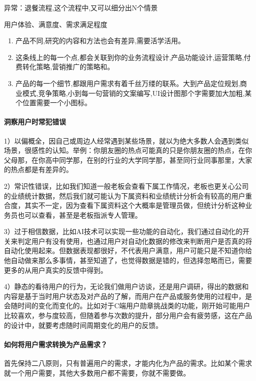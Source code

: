 \documentclass[letterpaper,11pt,english]{sphinxmanual}
\begin{document}
异常：退餐流程,这个流程中,又可以细分出N个情景

用户体验、满意度、需求满足程度
\begin{enumerate}
%
\item {} 
产品不同,研究的内容和方法也会有差异,需要活学活用。

\item {} 
这条线上的每一个点,都会关联到你的业务流程设计,产品功能设计,运营策略,付费转化策略,营销推广的策略和。

\item {} 
产品的每一个细节,都跟用户需求有着千丝万缕的联系。大到产品定位规划,商业模式,竞争策略,小到每一句营销的文案编写,UI设计图那个字需要加大加粗,某个位置需要一个小图标。

\end{enumerate}


\paragraph{洞察用户时常犯错误}
\label{\detokenize{chapter_skill/users_analysis:id19}}
1）以偏概全，因自己或周边人经常遇到某些场景，就以为绝大多数人会遇到类似场景，很感性的认知。举例：你朋友圈的热点可能真的只是你朋友圈的热点，在你父母那，在你高中同学那，在别的行业的大学同学那，甚至同行业同事那里，大家的热点都是有差异的。

2）常识性错误，比如我们知道一般老板会查看下属工作情况，老板也更关心公司的业绩统计数据，然后我们就可能认为下属资料和业绩统计分析会有较高的用户重合度，其实不一定，因为查看下属资料这个大概率是管理员做，但统计分析这种业务员也可以查看，甚至是老板指派专人管理。

3）过于相信数据，比如AI技术可以实现一些功能的自动化，我们通过自动化的开关来判定用户有没有使用，也通过用户对自动化数据的修改来判断用户是否真的将自动化使用起来。但数据表现都很好，不代表用户满意，用户可能只是不知道你给他自动做来那么多事情，甚至知道了，也觉得数据是错的，但选择忽略而已，需要更多的从用户真实的反馈中得到。

4）静态的看待用户的行为，无论我们做用户访谈，还是用户调研，得出的数据和内容是基于当时用户状态及对产品的了解，而用户在产品或服务使用的过程中，是会随时间的变化而变化的。比如对于C端用户勋章挑战类的功能，刚开始可能用户比较喜欢，参与度较高，但随着参与次数的提升，部分用户会有疲劳感，这在产品的设计中，就要考虑随时间周期变化的用户的反馈。


\paragraph{如何将用户需求转换为产品需求？}
\label{\detokenize{chapter_skill/users_analysis:id20}}
首先保持二八原则，只有普遍用户的需求，才能内化为产品的需求。比如某个需求就一个用户需要，其他大多数用户都不需要，你就不需要做。
\end{document}
